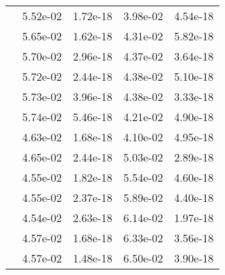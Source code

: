 \begin{table}
\begin{tabular}{c|cc|cc|}
\multicolumn{1}{|c|}{} & \multicolumn{1}{|c|}{  5.52e-02} & \multicolumn{1}{|c|}{  1.72e-18} & \multicolumn{1}{|c|}{  3.98e-02} & \multicolumn{1}{|c|}{  4.54e-18} \\ 
\multicolumn{1}{|c|}{} & \multicolumn{1}{|c|}{  5.65e-02} & \multicolumn{1}{|c|}{  1.62e-18} & \multicolumn{1}{|c|}{  4.31e-02} & \multicolumn{1}{|c|}{  5.82e-18} \\ 
\multicolumn{1}{|c|}{} & \multicolumn{1}{|c|}{  5.70e-02} & \multicolumn{1}{|c|}{  2.96e-18} & \multicolumn{1}{|c|}{  4.37e-02} & \multicolumn{1}{|c|}{  3.64e-18} \\ 
\multicolumn{1}{|c|}{} & \multicolumn{1}{|c|}{  5.72e-02} & \multicolumn{1}{|c|}{  2.44e-18} & \multicolumn{1}{|c|}{  4.38e-02} & \multicolumn{1}{|c|}{  5.10e-18} \\ 
\multicolumn{1}{|c|}{} & \multicolumn{1}{|c|}{  5.73e-02} & \multicolumn{1}{|c|}{  3.96e-18} & \multicolumn{1}{|c|}{  4.38e-02} & \multicolumn{1}{|c|}{  3.33e-18} \\ 
\multicolumn{1}{|c|}{} & \multicolumn{1}{|c|}{  5.74e-02} & \multicolumn{1}{|c|}{  5.46e-18} & \multicolumn{1}{|c|}{  4.21e-02} & \multicolumn{1}{|c|}{  4.90e-18} \\ 
\multicolumn{1}{|c|}{} & \multicolumn{1}{|c|}{  4.63e-02} & \multicolumn{1}{|c|}{  1.68e-18} & \multicolumn{1}{|c|}{  4.10e-02} & \multicolumn{1}{|c|}{  4.95e-18} \\ 
\multicolumn{1}{|c|}{} & \multicolumn{1}{|c|}{  4.65e-02} & \multicolumn{1}{|c|}{  2.44e-18} & \multicolumn{1}{|c|}{  5.03e-02} & \multicolumn{1}{|c|}{  2.89e-18} \\ 
\multicolumn{1}{|c|}{} & \multicolumn{1}{|c|}{  4.55e-02} & \multicolumn{1}{|c|}{  1.82e-18} & \multicolumn{1}{|c|}{  5.54e-02} & \multicolumn{1}{|c|}{  4.60e-18} \\ 
\multicolumn{1}{|c|}{} & \multicolumn{1}{|c|}{  4.55e-02} & \multicolumn{1}{|c|}{  2.37e-18} & \multicolumn{1}{|c|}{  5.89e-02} & \multicolumn{1}{|c|}{  4.40e-18} \\ 
\multicolumn{1}{|c|}{} & \multicolumn{1}{|c|}{  4.54e-02} & \multicolumn{1}{|c|}{  2.63e-18} & \multicolumn{1}{|c|}{  6.14e-02} & \multicolumn{1}{|c|}{  1.97e-18} \\ 
\multicolumn{1}{|c|}{} & \multicolumn{1}{|c|}{  4.57e-02} & \multicolumn{1}{|c|}{  1.68e-18} & \multicolumn{1}{|c|}{  6.33e-02} & \multicolumn{1}{|c|}{  3.56e-18} \\ 
\multicolumn{1}{|c|}{} & \multicolumn{1}{|c|}{  4.57e-02} & \multicolumn{1}{|c|}{  1.48e-18} & \multicolumn{1}{|c|}{  6.50e-02} & \multicolumn{1}{|c|}{  3.90e-18} \\ 

\end{tabular}
\end{table}
